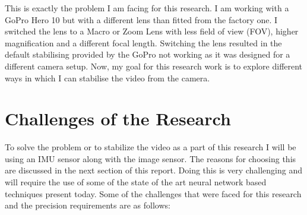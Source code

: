 This is exactly the problem I am facing for this research. I am working with a GoPro Hero 10 but with a different lens than fitted from the factory one. I switched the lens to a Macro or Zoom Lens with less field of view (FOV), higher magnification and a different focal length. Switching the lens resulted in the default stabilising provided by the GoPro not working as it was designed for a different camera setup. Now, my goal for this research work is to explore different ways in which I can stabilise the video from the camera.





\section{Challenges of the Research}
To solve the problem or to stabilize the video as a part of this research I will be using an IMU sensor along with the image sensor. The reasons for choosing this are discussed in the next section of this report. Doing this is very challenging and will require the use of some of the state of the art neural network based techniques present today. Some of the challenges that were faced for this research and the precision requirements are as follows:

